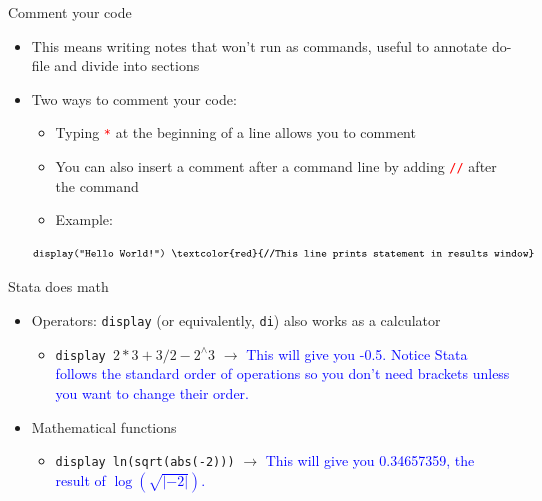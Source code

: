 \documentclass[11pt,notes=hide,aspectratio=169,mathserif]{beamer}
\begin{document}
\begin{frame}{Comment your code}
    \begin{itemize}
        \item This means writing notes that won't run as commands, useful to annotate do-file and divide into sections \medskip
        \item Two ways to comment your code:\smallskip
        \begin{itemize}
            \item Typing \textcolor{red}{\texttt{*}} at the beginning of a line allows you to comment \smallskip
            \item You can also insert a comment after a command line by adding \textcolor{red}{\texttt{//}} after the command\smallskip
            \item Example: \smallskip
                    \end{itemize}
            $$\footnotesize \texttt{display("Hello World!") \textcolor{red}{//This line prints statement in results window}}$$
    \end{itemize}
\end{frame}

\begin{frame}{Stata does math}
\begin{itemize}
    \item Operators: \texttt{display} (or equivalently, \texttt{di}) also works as a calculator \smallskip
    \begin{itemize}
        \item \texttt{display $2*3 + 3/2 - 2^{\wedge} 3$} $\rightarrow$ \textcolor{blue}{This will give you -0.5. Notice Stata follows the standard order of operations so you don't need brackets unless you want to change their order.}
    \end{itemize}\bigskip
    \item Mathematical functions\smallskip
\begin{itemize}
\item \texttt{display ln(sqrt(abs(-2)))} $\rightarrow$ \textcolor{blue}{This will give you 0.34657359, the result of $\log(\sqrt{|-2|})$. } 
\end{itemize}
\end{itemize}
\end{frame}
\end{document}
